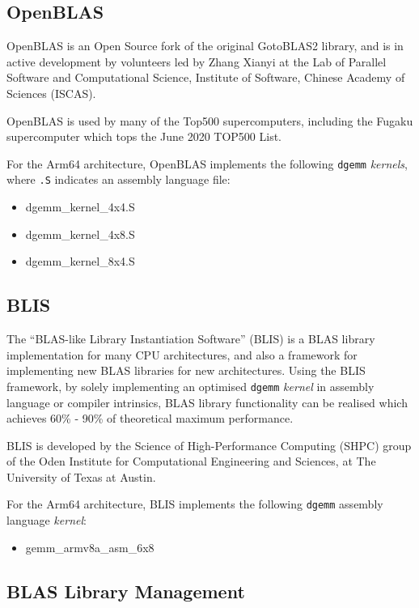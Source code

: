 %
%
\subsection{OpenBLAS}

OpenBLAS is an Open Source fork of the original GotoBLAS2 library, and is in active development by volunteers led by Zhang Xianyi at the Lab of Parallel Software and Computational Science, Institute of Software, Chinese Academy of Sciences (ISCAS).

OpenBLAS is used by many of the Top500 supercomputers, including the Fugaku supercomputer which tops the June 2020 TOP500 List.

For the Arm64 architecture, OpenBLAS implements the following \verb|dgemm| \emph{kernels}, where \verb|.S| indicates an assembly language file:

\begin{itemize}
  \item dgemm\_kernel\_4x4.S
  \item dgemm\_kernel\_4x8.S
  \item dgemm\_kernel\_8x4.S 
\end{itemize}


%
%
\subsection{BLIS}

The ``BLAS-like Library Instantiation Software'' (BLIS) is a BLAS library implementation for many CPU architectures, and also a framework for implementing new BLAS libraries for new architectures. Using the BLIS framework, by solely implementing an optimised \verb|dgemm| \emph{kernel} in assembly language or compiler intrinsics, BLAS library functionality can be realised which achieves 60\% - 90\% of theoretical maximum performance.

BLIS is developed by the Science of High-Performance Computing (SHPC) group of the Oden Institute for Computational Engineering and Sciences, at The University of Texas at Austin.

For the Arm64 architecture, BLIS implements the following \verb|dgemm| assembly language \emph{kernel}:

\begin{itemize}
  \item gemm\_armv8a\_asm\_6x8
\end{itemize}


%
%
\subsection{BLAS Library Management}

